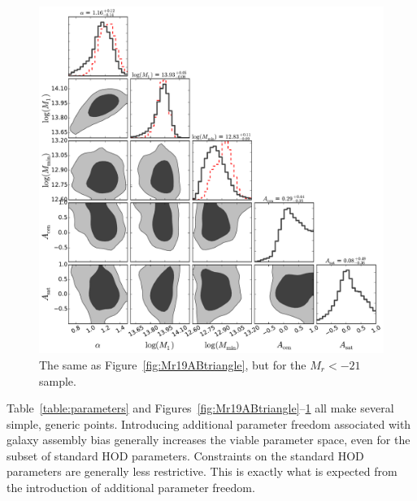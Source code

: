 \documentclass[usenatbib,usegraphicx,letterpaper]{mn2e}
\begin{document}
\begin{figure}
\begin{center}
\includegraphics[width=15.0cm]{Mr21ABTri.pdf}
\caption{
The same as Figure~\ref{fig:Mr19ABtriangle}, but for the $M_r<-21$ sample.
}
\label{fig:Mr21ABtriangle}
\end{center}
\end{figure}


Table~\ref{table:parameters} and Figures~\ref{fig:Mr19ABtriangle}--\ref{fig:Mr21ABtriangle}
all make several simple, generic points. Introducing additional parameter
freedom associated with galaxy assembly bias generally increases the viable parameter
space, even for the subset of standard HOD parameters. Constraints on the
standard HOD parameters are generally less restrictive. This is exactly what is
expected from the introduction of additional parameter freedom.
\end{document}

